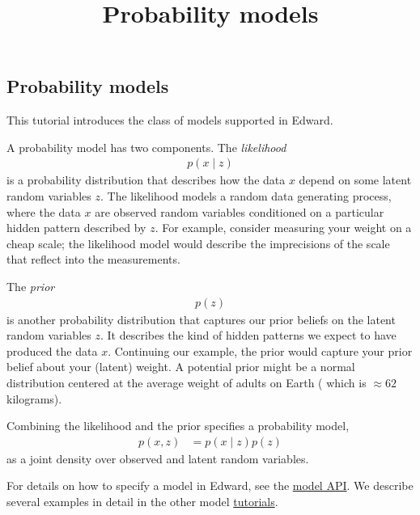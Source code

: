 \title{Probability models}

\subsection{Probability models}

This tutorial introduces the class of models supported in Edward.


A probability model has two components. The \emph{likelihood}
\begin{align*}
  p(x \mid z)
\end{align*}
is a probability distribution that describes how the data $x$ depend on some
latent random variables $z$. The likelihood models a random data generating
process, where the data $x$ are observed random variables conditioned on a
particular hidden pattern described by $z$. For example, consider measuring your
weight on a cheap scale; the likelihood model would describe the imprecisions
of the scale that reflect into the measurements.

The \emph{prior}
\begin{align*}
  p(z)
\end{align*}
is another probability distribution that captures our prior beliefs on
the latent random variables $z$. It describes the kind of hidden patterns we
expect to have produced the data $x$. Continuing our example, the prior would
capture your prior belief about your (latent) weight. A potential prior might be
a normal distribution centered at the average weight of adults on Earth (
which is $\approx62$ kilograms).

Combining the likelihood and the prior specifies a probability model,
\begin{align*}
  p(x,z)
  &=
  p(x \mid z)
  p(z)
\end{align*}
as a joint density over observed and latent random variables.

For details on how to specify a model in Edward, see the
\href{api/models_models.html}{model API}. We describe several examples in detail
in the
other model \href{tutorials.html}{tutorials}.
